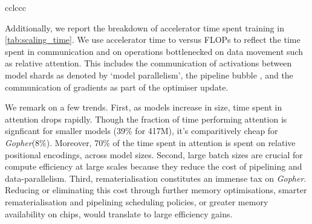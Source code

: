 \documentclass[11pt, a4paper, logo, internal, copyright, nonumbering]{deepmind}
\newcommand{\gopher}{\textit{Gopher}\xspace}
\begin{document}
\begin{center}
\begin{longtable}{cclccc}
{Additionally, we report the breakdown of accelerator time spent training in \autoref{tab:scaling_time}. We use accelerator time to versus FLOPs to reflect the time spent in communication and on operations bottlenecked on data movement such as relative attention.
This includes the communication of activations between model shards as denoted by `model parallelism', the pipeline bubble \citep{huang2019gpipe}, and the communication of gradients as part of the optimiser update.

We remark on a few trends.
First, as models increase in size, time spent in attention drops rapidly. Though the fraction of time performing attention is signficant for smaller models (39\% for 417M), it's comparitively cheap for \gopher (8\%). Moreover, 70\% of the time spent in attention is spent on relative positional encodings, across model sizes.
Second, large batch sizes are crucial for compute efficiency at large scales because they reduce the cost of pipelining and data-parallelism.
Third, rematerialisation constitutes an immense tax on \gopher. Reducing or eliminating this cost through further memory optimisations, smarter rematerialisation and pipelining scheduling policies, or greater memory availability on chips, would translate to large efficiency gains.

\begin{table}
    \centering
    \caption{\textbf{Training Time Breakdown}. Percentage of the accelerator time spent on different tasks for various models, to the nearest percent. The \textit{Linears} category includes the attention query, key, value, and output projections. The \textit{Optimiser} category includes reducing the gradient across data-parallel workers, updating the parameters, and gathering the results across data-parallel workers. For 280B, we report the more efficient 6M token batch size; at 3M tokens the contribution of \textit{Pipelining} and \textit{Optimiser} are roughly doubled.}
    \label{tab:scaling_time}
\end{table}

}
\end{longtable}
\end{center}
\end{document}
